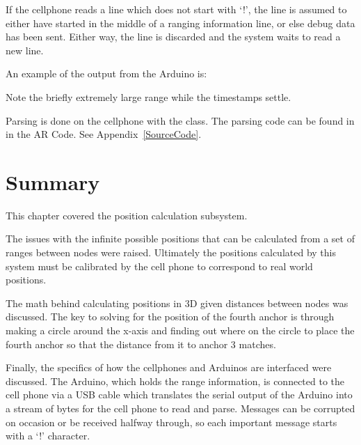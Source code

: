 \begin{center}
\end{center}


If the cellphone reads a line which does not start with `!', the line is assumed to either have started in the middle of a ranging information line, or else debug data has been sent. Either way, the line is discarded and the system waits to read a new line.

An example of the output from the Arduino is:


Note the briefly extremely large range while the timestamps settle.

Parsing is done on the cellphone with the  class. The parsing code can be found in  in the AR Code. See Appendix~\ref{SourceCode}.

\section{Summary}
This chapter covered the position calculation subsystem.

The issues with the infinite possible positions that can be calculated from a set of ranges between nodes were raised. Ultimately the positions calculated by this system must be calibrated by the cell phone to correspond to real world positions.

The math behind calculating positions in 3D given distances between nodes was discussed. The key to solving for the position of the fourth anchor is through making a circle around the x-axis and finding out where on the circle to place the fourth anchor so that the distance from it to anchor 3 matches.

Finally, the specifics of how the cellphones and Arduinos are interfaced were discussed. The Arduino, which holds the range information, is connected to the cell phone via a USB cable which translates the serial output of the Arduino into a stream of bytes for the cell phone to read and parse. Messages can be corrupted on occasion or be received halfway through, so each important message starts with a `!' character.